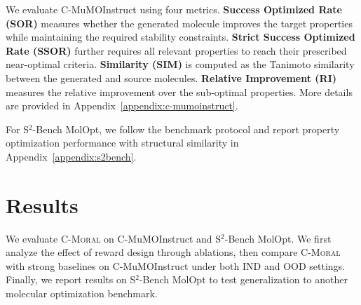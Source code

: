 \documentclass[11pt]{article}
\newcommand{\YS}[1]{\textcolor{blue}{\emph{[YS: #1]}}}
\begin{document}
We evaluate C-MuMOInstruct using four metrics. \textbf{Success Optimized Rate (\textsc{SOR})} measures whether the generated molecule improves the target properties while maintaining the required stability constraints. \textbf{Strict Success Optimized Rate (\textsc{SSOR})} further requires all relevant properties to reach their prescribed near-optimal criteria. \textbf{Similarity (\textsc{SIM})} is computed as the Tanimoto similarity between the generated and source molecules. \textbf{Relative Improvement (\textsc{RI})} measures the relative improvement over the sub-optimal properties. More details are provided in Appendix~\ref{appendix:c-mumoinstruct}.

For S$^2$-Bench MolOpt, we follow the benchmark protocol and report property optimization performance with structural similarity in Appendix~\ref{appendix:s2bench}.


\section{Results}
\label{sec:results}

We evaluate \textsc{C-Moral} on C-MuMOInstruct and S$^2$-Bench MolOpt. We first analyze the effect of reward design through ablations, then compare \textsc{C-Moral} with strong baselines on C-MuMOInstruct under both IND and OOD settings. Finally, we report results on S$^2$-Bench MolOpt to test generalization to another molecular optimization benchmark.


\end{document}
